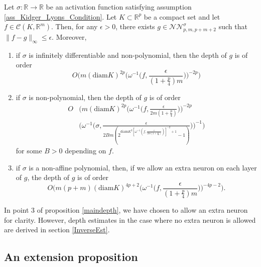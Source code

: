 \documentclass[anon,12pt]{colt2021} %
\begin{document}
\begin{proposition}\label{maindepth}
Let $\sigma: \mathbb{R} \rightarrow \mathbb{R}$ be an activation function satisfying assumption \ref{ass_Kidger_Lyons_Condition}. Let $K \subset \mathbb{R}^{p}$ be a compact set and let $f \in \mathcal{C}(K, \mathbb{R}^{m})$. Then, for any $\epsilon >0$, there exists $g \in \mathcal{NN}_{p, m, p+m+2}^{\sigma}$ such that $\| f - g\|_{\infty} \leq \epsilon$. Moreover,
\begin{enumerate}[label=(i),leftmargin=1.75em]
    \item if $\sigma$ is infinitely differentiable and non-polynomial, then the depth of $g$ is of order
    \begin{equation}
        O\bigg(m (\text{diam}K)^{2p} \bigg(\omega^{-1} \big(f, \frac{\epsilon}{(1+\frac{p}{4})m} \big) \bigg)^{-2p} \bigg)
    \end{equation}
    \item if $\sigma$ is non-polynomial, then the depth of $g$ is of order
    \begin{align} \label{depthcontinuous}
        O &\bigg( m (\text{diam}K)^{2p} \bigg(\omega^{-1} \big(f, \frac{\epsilon}{2m(1+\frac{p}{4})} \big) \bigg)^{-2p} \nonumber \\
        &\bigg( \omega^{-1} \big( \sigma, \frac{\epsilon}{2Bm(2^{\text{diam}K^{2}[\omega^{-1}(f, \frac{\epsilon}{2m(1+\frac{p}{4})})]^{-2}+1} -1)} \big) \bigg)^{-1}\bigg)
    \end{align}
    for some $B > 0$ depending on $f$.
    \item if $\sigma$ is a non-affine polynomial, then, if we allow an extra neuron on each layer of $g$, the depth of $g$ is of order
    \begin{equation}
        O \bigg(m(p+m)(\text{diam}K)^{4p+2}\bigg(\omega^{-1} \big(f, \frac{\epsilon}{(1+\frac{p}{4})m} \big) \bigg)^{-4p-2} \bigg).
    \end{equation}
\end{enumerate}
\end{proposition}

\begin{remark}
In point 3 of proposition \ref{maindepth}, we have chosen to allow an extra neuron for clarity. However, depth estimates in the case where no extra neuron is allowed are derived in section \ref{InverseEst}. 
\end{remark}

\subsection{An extension proposition}
\end{document}
